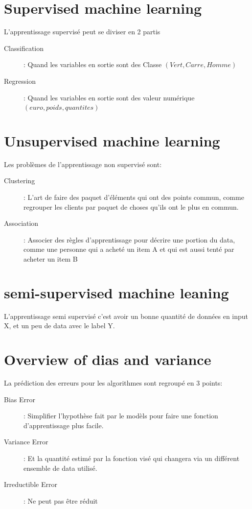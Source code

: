 \section{Supervised machine learning}
L'apprentissage supervisé peut se diviser en 2 partis
\begin{description}
\item[Classification]: Quand les variables en sortie sont des Classe $(Vert, Carre, Homme)$
\item[Regression]: Quand les variables en sortie sont des valeur numérique $(euro, poids, quantites)$
\end{description}

\section{Unsupervised machine learning}
Les problèmes de l'apprentissage non supervisé sont:
\begin{description}
\item[Clustering]: L'art de faire des paquet d'éléments qui ont des points commun, comme regrouper les clients par paquet de choses qu'ils ont le plus en commun.
\item[Association]: Associer des règles d'apprentissage pour décrire une portion du data, comme une personne qui a acheté un item A et qui est aussi tenté par acheter un item B
\end{description}

\section{semi-supervised machine leaning}
L'apprentissage semi supervisé c'est avoir un bonne quantité de données en input X, et un peu de data avec le label Y.

\section{Overview of dias and variance}
La prédiction des erreurs pour les algorithmes sont regroupé en 3 points:
\begin{description}
\item[Bias Error]:  Simplifier l'hypothèse fait par le modèls pour faire une fonction d'apprentissage plus facile.
\item[Variance Error]: Et la quantité estimé par la fonction visé qui changera via un différent ensemble de data utilisé.
\item[Irreductible Error]: Ne peut pas être réduit
\end{description}

